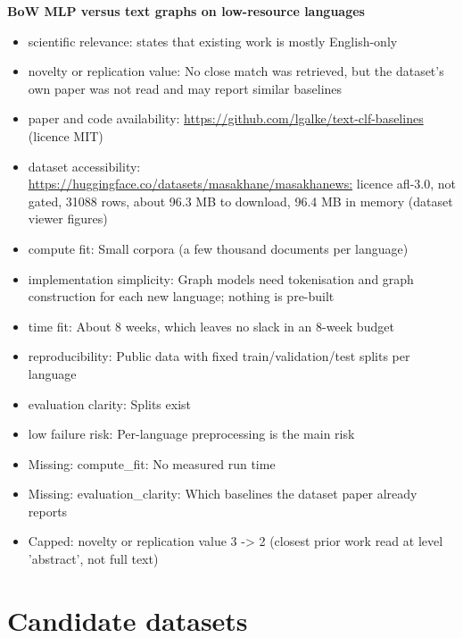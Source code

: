 \documentclass[11pt,a4paper]{article}
\begin{document}
\textbf{BoW MLP versus text graphs on low-resource languages}
\begin{itemize}
\item scientific relevance: \cite{ghosh2022} states that existing work is mostly English-only
\item novelty or replication value: No close match was retrieved, but the dataset's own paper was not read and may report similar baselines
\item paper and code availability: \url{https://github.com/lgalke/text-clf-baselines} (licence MIT)
\item dataset accessibility: \url{https://huggingface.co/datasets/masakhane/masakhanews:} licence afl-3.0, not gated, 31088 rows, about 96.3 MB to download, 96.4 MB in memory (dataset viewer figures)
\item compute fit: Small corpora (a few thousand documents per language)
\item implementation simplicity: Graph models need tokenisation and graph construction for each new language; nothing is pre-built
\item time fit: About 8 weeks, which leaves no slack in an 8-week budget
\item reproducibility: Public data with fixed train/validation/test splits per language
\item evaluation clarity: Splits exist
\item low failure risk: Per-language preprocessing is the main risk
\item Missing: compute\_fit: No measured run time
\item Missing: evaluation\_clarity: Which baselines the dataset paper already reports
\item Capped: novelty or replication value 3 -> 2 (closest prior work read at level 'abstract', not full text)
\end{itemize}

\section{Candidate datasets}
\end{document}
